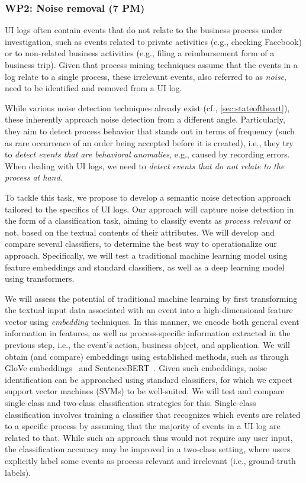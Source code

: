 \subsubsection{WP2:  Noise removal (7 PM)}
\label{sec:wp2}

UI logs often contain events that do not relate to the business process under investigation, such as events related to private activities (e.g., checking Facebook) or to non-related business activities (e.g., filing a reimbursement form of a business trip).
Given that process mining techniques assume that the events in a log relate to a single process, these irrelevant events, also referred to as \emph{noise}, need to be identified and removed from a UI log.

While various noise detection techniques already exist (cf., \autoref{sec:stateoftheart}), these  inherently approach noise detection from a different angle. Particularly, they aim to detect process behavior that stands out in terms of frequency (such as rare occurrence of an order being accepted before it is created), i.e., they try to \emph{detect events that are behavioral anomalies}, e.g., caused by recording errors.
When dealing with UI logs, we need to \emph{detect events that do not relate to the process at hand}. 

To tackle this task, we propose to develop a semantic noise detection approach tailored to the specifics of UI logs. Our approach will capture noise detection in the form of a classification task, aiming to classify events as \emph{process relevant} or not, based on the textual contents of their attributes. We will develop and compare several classifiers, to determine the best way to operationalize our approach. Specifically, we will test a traditional machine learning model using feature embeddings and standard classifiers, as well as a deep learning model using transformers.

We will assess the potential of traditional machine learning by first transforming the textual input data associated with an event into a high-dimensional feature vector using \textit{embedding} techniques. In this manner, we encode both general event information in features, as well as process-specific information extracted in the previous step, i.e., the event's action, business object, and application. We will obtain (and compare) embeddings using established methods, such as through GloVe embeddings~\cite{pennington2014glove} and SentenceBERT~\cite{reimers-2019-sentence-bert}.
\newline 
Given such embeddings, noise identification can be approached  using standard classifiers, for which we expect support vector machines (SVMs) to be well-suited. 
We will test and compare single-class and two-class classification strategies for this.
Single-class classification involves training a classifier that recognizes which events are related to a specific process by assuming that the majority of events in a UI log are related to that. While such an approach thus would not require any user input, the classification accuracy may be improved in a two-class setting, where users explicitly label some events as process relevant and irrelevant (i.e., ground-truth labels). 

